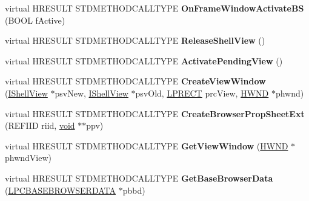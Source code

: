 \begin{DoxyCompactItemize}
\item 
\mbox{\label{class_c_common_browser_a9fc406711d670497f17a8c541b70f54c}} 
virtual H\+R\+E\+S\+U\+LT S\+T\+D\+M\+E\+T\+H\+O\+D\+C\+A\+L\+L\+T\+Y\+PE {\bfseries On\+Frame\+Window\+Activate\+BS} (B\+O\+OL f\+Active)
\item 
\mbox{\label{class_c_common_browser_a10a840ca06fadbed82b3e4bfe4c869a8}} 
virtual H\+R\+E\+S\+U\+LT S\+T\+D\+M\+E\+T\+H\+O\+D\+C\+A\+L\+L\+T\+Y\+PE {\bfseries Release\+Shell\+View} ()
\item 
\mbox{\label{class_c_common_browser_aa38906d32003ac0901dad19fa061ad58}} 
virtual H\+R\+E\+S\+U\+LT S\+T\+D\+M\+E\+T\+H\+O\+D\+C\+A\+L\+L\+T\+Y\+PE {\bfseries Activate\+Pending\+View} ()
\item 
\mbox{\label{class_c_common_browser_ac4d0d393db687c0c1b0727afc5ccc6d1}} 
virtual H\+R\+E\+S\+U\+LT S\+T\+D\+M\+E\+T\+H\+O\+D\+C\+A\+L\+L\+T\+Y\+PE {\bfseries Create\+View\+Window} (\hyperlink{interface_i_shell_view}{I\+Shell\+View} $\ast$psv\+New, \hyperlink{interface_i_shell_view}{I\+Shell\+View} $\ast$psv\+Old, \hyperlink{structtag_r_e_c_t}{L\+P\+R\+E\+CT} prc\+View, \hyperlink{interfacevoid}{H\+W\+ND} $\ast$phwnd)
\item 
\mbox{\label{class_c_common_browser_a03a2e396134358b95ec3507a5a2b2c48}} 
virtual H\+R\+E\+S\+U\+LT S\+T\+D\+M\+E\+T\+H\+O\+D\+C\+A\+L\+L\+T\+Y\+PE {\bfseries Create\+Browser\+Prop\+Sheet\+Ext} (R\+E\+F\+I\+ID riid, \hyperlink{interfacevoid}{void} $\ast$$\ast$ppv)
\item 
\mbox{\label{class_c_common_browser_ab29206e77cdcecea5b7be64ab5ed37d4}} 
virtual H\+R\+E\+S\+U\+LT S\+T\+D\+M\+E\+T\+H\+O\+D\+C\+A\+L\+L\+T\+Y\+PE {\bfseries Get\+View\+Window} (\hyperlink{interfacevoid}{H\+W\+ND} $\ast$phwnd\+View)
\item 
\mbox{\label{class_c_common_browser_a60a9dc17c3dbc5c118540986c68ed06a}} 
virtual H\+R\+E\+S\+U\+LT S\+T\+D\+M\+E\+T\+H\+O\+D\+C\+A\+L\+L\+T\+Y\+PE {\bfseries Get\+Base\+Browser\+Data} (\hyperlink{structbasebrowserdataxp}{L\+P\+C\+B\+A\+S\+E\+B\+R\+O\+W\+S\+E\+R\+D\+A\+TA} $\ast$pbbd)
$$
\end{DoxyCompactItemize}
